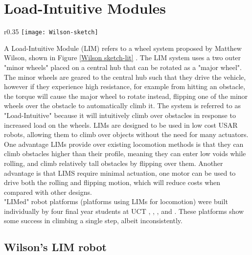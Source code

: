 \section{Load-Intuitive Modules} %

\begin{wrapfigure}{r}{0.35\textwidth} %
	\centering
	\texttt{[image: Wilson-sketch]}
	\caption{Systems layout of Wilson's LIM device \citep{Wilson-2013}}
	\label{Wilson sketch-lit}
\end{wrapfigure}

A Load-Intuitive Module (LIM) refers to a wheel system proposed by Matthew Wilson, shown in Figure \ref{Wilson sketch-lit} \citep{Wilson-2013}. The LIM system uses a two outer "minor wheels" placed on a central hub that can be rotated as a "major wheel". The minor wheels are geared to the central hub such that they drive the vehicle, however if they experience high resistance, for example from hitting an obstacle, the torque will cause the major wheel to rotate instead, flipping one of the minor wheels over the obstacle to automatically climb it. The system is referred to as "Load-Intuitive" because it will intuitively climb over obstacles in response to increased load on the wheels. LIMs are designed to be used in low cost USAR robots, allowing them to climb over objects without the need for many actuators.\\

One advantage LIMs provide over existing locomotion methods is that they can climb obstacles higher than their profile, meaning they can enter low voids while rolling, and climb relatively tall obstacles by flipping over them. Another advantage is that LIMS require minimal actuation, one motor can be used to drive both the rolling and flipping motion, which will reduce costs when compared with other designs.\\

\noindent "LIMed" robot platforms (platforms using LIMs for locomotion) were built individually by four final year students at UCT \citep{Wilson-2013}, \citep{Haskel-2017}, \citep{Buchanan-2018}, and \citep{Powrie-2019}. These platforms show some success in climbing a single step, albeit inconsistently.
\newpage

\subsection{Wilson's LIM robot} %

